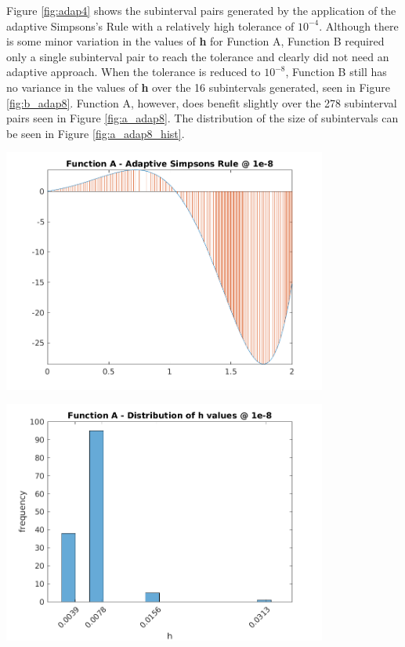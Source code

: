 \documentclass[a4paper]{article}
\begin{document}
Figure \ref{fig:adap4} shows the subinterval pairs generated by the application of the adaptive Simpsons's Rule with a relatively high tolerance of $10^{-4}$. Although there is some minor variation in the values of \textbf{h} for Function A, Function B required only a single subinterval pair to reach the tolerance and clearly did not need an adaptive approach. When the tolerance is reduced to $10^{-8}$, Function B still has no variance in the values of \textbf{h} over the 16 subintervals generated, seen in Figure \ref{fig:b_adap8}. Function A, however, does benefit slightly over the 278 subinterval pairs seen in Figure \ref{fig:a_adap8}. The distribution of the size of subintervals can be seen in Figure \ref{fig:a_adap8_hist}.


\begin{center}
	\includegraphics[width=0.8\textwidth]{../output/a_adaptive_simpsons_8.png}
	\label{fig:a_adap8}
\end{center}

\begin{center}
	\includegraphics[width=0.8\textwidth]{../output/a_adaptive_simpsons_8_hist.png}
	\label{fig:a_adap8_hist}
\end{center}
\end{document}
